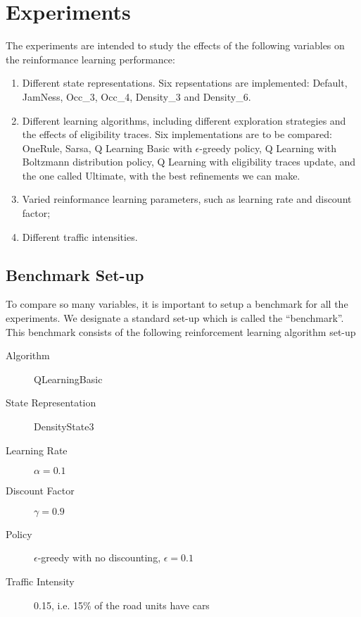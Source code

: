 \section{Experiments}

The experiments are intended to study the effects of the following variables on
the reinformance learning performance:

\begin{enumerate}
\item Different state representations. Six repsentations are implemented: Default, JamNess, Occ\_3, Occ\_4, Density\_3 and Density\_6. 

\item Different learning algorithms, including different exploration strategies
and the effects of eligibility traces. Six implementations are to be compared:
OneRule, Sarsa, Q Learning Basic with $\epsilon$-greedy policy, Q Learning with
Boltzmann distribution policy, Q Learning with eligibility traces update, and
the one called Ultimate, with the best refinements we can make.

\item Varied reinformance learning parameters, such as learning rate and discount factor;

\item Different traffic intensities.

\end{enumerate}

\subsection{Benchmark Set-up}

To compare so many variables, it is important to setup a benchmark for all the experiments.
We designate a standard set-up which is called the ``benchmark''. This
benchmark consists of the following reinforcement learning
algorithm set-up

\begin{description}
\item[Algorithm] QLearningBasic
\item[State Representation] DensityState3
\item[Learning Rate] $\alpha = 0.1$
\item[Discount Factor] $\gamma = 0.9$
\item[Policy] $\epsilon$-greedy with no discounting, $\epsilon = 0.1$
\item[Traffic Intensity] 0.15, i.e. 15\% of the road units have cars
\end{description}

